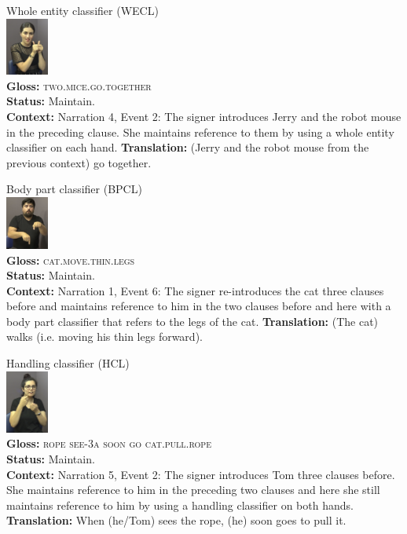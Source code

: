 \documentclass[review]{elsarticle} %
\begin{document}
\begin{exe}
\ex
\begin{xlist}
\ex \label{ex:4a} Whole entity classifier  (WECL) \\\glll
{} \includegraphics[width=40pt]{pictures/p6.png} \\ \textbf{Gloss:} \textsc{two.mice.go.together} \\ 
\textbf{Status:} Maintain. \\
\glt \textbf{Context:} Narration 4, Event 2: The signer introduces Jerry and the robot mouse in the preceding clause. She maintains reference to them by using a whole entity classifier on each hand. 
\glt \textbf{Translation:} (Jerry and the robot mouse from the previous context) go together.
\vspace{0.35cm}

\ex \label{ex:4b} Body part classifier (BPCL) \\\glll
{} \includegraphics[width=40pt]{pictures/p7.png} \\ \textbf{Gloss:} \textsc{cat.move.thin.legs} \\ 
\textbf{Status:} Maintain. \\
\glt \textbf{Context:} Narration 1, Event 6: The signer re-introduces the cat three clauses before and maintains reference to him in the two clauses before and here with a body part classifier that refers to the legs of the cat.
\glt \textbf{Translation:} (The cat) walks (i.e. moving his thin legs forward).
\vspace{0.35cm}

\ex \label{ex:4c} Handling classifier (HCL) \\\glll
{} {} {} {} {} \includegraphics[width=40pt]{pictures/p8.png} \\ \textbf{Gloss:} {} \textsc{rope see-3a} \textsc{soon} \textsc{go} \textsc{cat.pull.rope} \\ 
\textbf{Status:} Maintain. \\
\glt \textbf{Context:} Narration 5, Event 2: The signer introduces Tom three clauses before. She maintains reference to him in the preceding two clauses and here she still maintains reference to him by using a handling classifier on both hands.
\glt \textbf{Translation:} When (he/Tom) sees the rope, (he) soon goes to pull it.
\vspace{0.35cm}


\end{xlist}
\end{exe}
\end{document}
